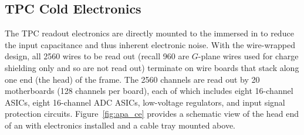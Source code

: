 \begin{comment}
\begin{dunetable}[\dword{apa} interface control documents]{lr}{tab:apa_interface_docdb}
{Summary of interface control documents being developed.}  
  Interface Document & DUNE doc-db number \\\colhline 
  Interface to TPC electronics & 6670 \\ \colhline 
  Interface to photon detector system & 6667 \\ \colhline
  Interface to drift high voltage system & 6673 \\ \colhline
  Interface to DAQ & 6676 \\ \colhline
  Interface to slow controls and cryogenics infrastructure & 6679 \\\specialrule{1.5pt}{1pt}{1pt}
  Integration facility interface & 7021 \\ \colhline
  Facility interfaces (Detector Hall, Cryostat, and Cryogenics) & 6967 \\ \colhline
  Installation interface & 6994 \\ \colhline
  Calibration interface & 7048 \\\specialrule{1.5pt}{1pt}{1pt}
  Software computing interface & 7102 \\ \colhline
  Physics interface & 7075 \\ \colhline
\end{dunetable}
\end{comment}


\subsection{TPC Cold Electronics}
\label{sec:fdsp-apa-intfc-elec}

The TPC readout electronics are directly mounted to the  immersed in \lar to reduce the input capacitance and thus inherent electronic noise.  With the wire-wrapped design, all \num{2560} wires to be read out (recall \num{960} are $G$-plane wires used for charge shielding only and so are not read out) terminate on wire boards that stack along one end (the head) of the  frame.  The \num{2560} channels are read out by \num{20}  motherboards (\num{128} channels per board), each of which includes eight \num{16}-channel  ASICs, eight \num{16}-channel ADC ASICs, low-voltage regulators, and input signal protection circuits.  Figure~\ref{fig:apa_ce} provides a schematic view of the head end of an  with electronics installed and a cable tray mounted above. 

